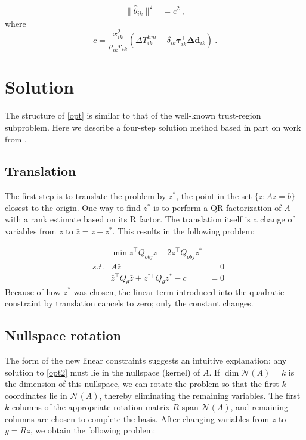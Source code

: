 \documentclass[conference]{IEEEtran}
\begin{document}
\begin{align*}
\lVert \hat{\theta}_{ik}\rVert^2 &= c^2~,
\end{align*}
where $$c = \frac{x_{ik}^2}{\rho_{ik} r_{ik}} \left(\Delta T_{ik}^{lim} - \delta_{ik} \boldsymbol{\tau}_{ik}^\top \boldsymbol{\Delta d}_{ik}\right)~. $$

\section{Solution}

The structure of \eqref{opt} is similar to that of the well-known trust-region subproblem. Here we describe a four-step solution method based in part on work from \cite{bienstock2014}.

\subsection{Translation}

The first step is to translate the problem by $z^*$, the point in the set $\{z:Az=b\}$ closest to the origin. One way to find $z^*$ is to perform a QR factorization of $A$ with a rank estimate based on its R factor. The translation itself is a change of variables from $z$ to $\bar{z}=z - z^*$. This results in the following problem:

\begin{subequations}\label{opt2}
\begin{align}
\label{opt2:obj} && \min \bar{z}^\top Q_{obj}\bar{z} + 2\bar{z}^\top Q_{obj}z^* &\\
\label{opt2:lin} & s.t. & A\bar{z} &= 0 \\
\label{opt2:quad} && \bar{z}^\top Q_{\theta}\bar{z} + z^{*\top}Q_\theta z^* - c &= 0 
\end{align}
\end{subequations}
Because of how $z^*$ was chosen, the linear term introduced into the quadratic constraint by translation cancels to zero; only the constant changes.

\subsection{Nullspace rotation}

The form of the new linear constraints suggests an intuitive explanation: any solution to \eqref{opt2} must lie in the nullspace (kernel) of $A$. If $\dim \mathcal{N}(A) =k$ is the dimension of this nullspace, we can rotate the problem so that the first $k$ coordinates lie in $\mathcal{N}(A)$, thereby eliminating the remaining variables. The first $k$ columns of the appropriate rotation matrix $R$ span $\mathcal{N}(A)$, and remaining columns are chosen to complete the basis. After changing variables from $\bar{z}$ to $y= R\bar{z}$, we obtain the following problem:
\end{document}
